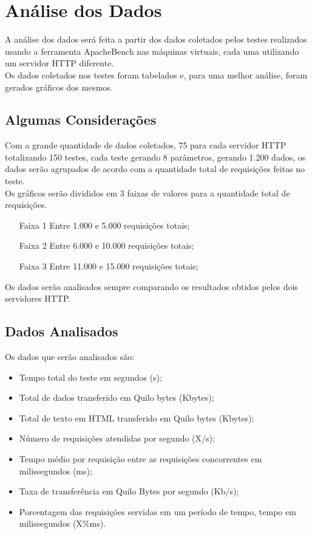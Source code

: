 \chapter{Análise dos Dados}\label{cap:analise-dos-dados}

A análise dos dados será feita a partir dos dados coletados pelos testes realizados usando a ferramenta ApacheBench nas máquinas virtuais, cada uma utilizando um servidor HTTP diferente.\\
Os dados coletados nos testes foram tabelados e, para uma melhor análise, foram gerados gráficos dos mesmos.

\section{Algumas Considerações}
Com a grande quantidade de dados coletados, 75 para cada servidor HTTP totalizando 150 testes, cada teste gerando 8 parâmetros, gerando 1.200 dados, os dados serão agrupados de acordo com a quantidade total de requisições feitas no teste. \\
Os gráficos serão divididos em 3 faixas de valores para a quantidade total de requisições.
\begin{itemize}
	\item[Faixa 1] Entre 1.000 e 5.000 requisições totais;
	\item[Faixa 2] Entre 6.000 e 10.000 requisições totais;
	\item[Faixa 3] Entre 11.000 e 15.000 requisições totais;
\end{itemize}
Os dados serão analisados sempre comparando os resultados obtidos pelos dois servidores HTTP.\\

\section{Dados Analisados}
Os dados que serão analisados são:

\begin{itemize}
	\item Tempo total do teste em segundos (s); %
	\item Total de dados transferido em Quilo bytes (Kbytes); %
	\item Total de texto em HTML transferido em Quilo bytes (Kbytes); 
	\item Número de requisições atendidas por segundo (X/s); %
	\item Tempo médio por requisição entre as requisições concorrentes em 
	milissegundos (ms); %
	\item Taxa de transferência em Quilo Bytes por segundo (Kb/s); %
	\item Porcentagem das requisições servidas em um período de tempo, tempo em 
	milissegundos (X\%ms). %
\end{itemize}

